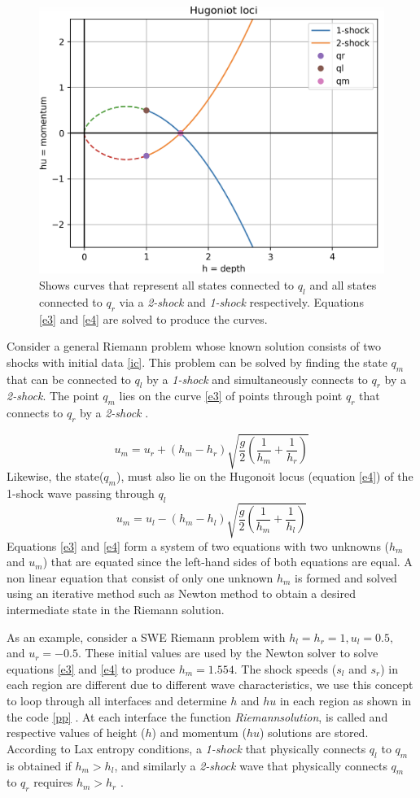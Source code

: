 \documentclass[12pt,a4paper]{article}
\begin{document}
	\begin{figure}[H]
		\centering
		\includegraphics[width=0.5\linewidth]{images/hl}
		\caption{Shows curves that represent all states connected to $q_l$ and all states connected to $q_r$ via a {\em 2-shock} and {\em 1-shock} respectively.  Equations \eqref{e3} and \eqref{e4} are solved to produce the curves.}
		\label{fig:hl}
	\end{figure}
	
	Consider a general Riemann problem whose known solution consists of two shocks with initial data \eqref{ic}. This problem can be solved by finding the state $q_m$ that can be connected to $q_l$ by a {\em 1-shock} and simultaneously connects to $q_r$ by a {\em 2-shock}. The point $q_m$ lies on the  curve \eqref{e3} of points  through  point $q_r$  that connects to $q_r$ by a {\em 2-shock} \cite{be-ge-le-ma:2011}.
	
	\begin{equation}
		u_{m} = u_{r} + (h_{m} - h_{r})\sqrt{\frac{g}{2}\left(\frac{1}{h_m} + \frac{1}{h_r} \right)}
		\label{e3}
	\end{equation}
	Likewise, the state($q_m$), must also lie on the Hugonoit locus (equation \eqref{e4}) of the 1-shock wave passing through $q_l$
	\begin{equation}
		u_{m} = u_{l} - (h_{m} - h_{l})\sqrt{\frac{g}{2}\left(\frac{1}{h_m} + \frac{1}{h_l} \right)}
		\label{e4}
	\end{equation}
	Equations \eqref{e3} and \eqref{e4} form a system of two equations with two unknowns ($h_m$ and $u_m$) that are equated since the left-hand sides of both equations are equal. A non linear equation that consist of only one unknown $h_m$ is formed and solved using an iterative method such as Newton method to obtain a desired intermediate state in the Riemann solution\cite{le-ge-be:2011}.
	
	As an example, consider a SWE Riemann problem with $h_l = h_r = 1, u_l = 0.5, $ and $u_r = -0.5$. These initial values are used by the Newton solver to solve equations \eqref{e3} and \eqref{e4} to produce $h_{m} = 1.554$. The shock speeds ($s_l$ and $s_r$) in each region are different due to different wave characteristics, we use this concept to loop through all interfaces and determine $h$ and $hu$ in each region as shown in the code \ref{pp} . At each interface the function {\em Riemann\textunderscore solution}, is called and respective values of   height ($h$) and momentum  ($hu$) solutions are stored. According to Lax entropy conditions, a  {\em 1-shock} that physically connects $q_l$ to $q_m$ is obtained if $h_m>h_l$, and similarly a {\em 2-shock} wave that physically connects $q_m$ to $q_r$ requires $h_m>h_r$ \cite{le-ge-be:2011}.
	
\end{document}
